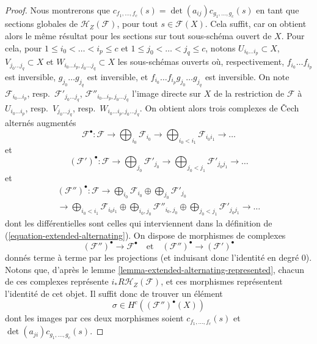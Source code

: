 \begin{proof}
Nous montrerons que $c_{f_1, \ldots, f_c}(s) =
\det(a_{ij}) c_{g_1, \ldots, g_c}(s)$ en tant que sections globales de
$\mathcal{H}_Z(\mathcal{F})$, pour tout $s \in \mathcal{F}(X)$.
Cela suffit, car on obtient alors le même résultat pour les
sections sur tout sous-schéma ouvert de $X$.
Pour cela, pour $1 \leq i_0 < \ldots < i_p \leq c$
et $1 \leq j_0 < \ldots < j_q \leq c$, notons
$U_{i_0 \ldots i_p} \subset X$,
$V_{j_0 \ldots j_q} \subset X$ et
$W_{i_0 \ldots i_p, j_0 \ldots j_q} \subset X$
les sous-schémas ouverts où, respectivement, $f_{i_0} \ldots f_{i_p}$ est inversible,
$g_{j_0} \ldots g_{j_q}$ est inversible, et
$f_{i_0} \ldots f_{i_p}g_{j_0} \ldots g_{j_q}$ est inversible.
On note $\mathcal{F}_{i_0 \ldots i_p}$,
resp.\ $\mathcal{F}'_{j_0 \ldots j_q}$,
$\mathcal{F}''_{i_0 \ldots i_p, j_0 \ldots j_q}$
l'image directe sur $X$ de la restriction de $\mathcal{F}$ à
$U_{i_0 \ldots i_p}$, resp.\ $V_{j_0 \ldots j_q}$,
resp.\ $W_{i_0 \ldots i_p, j_0 \ldots j_q}$.
On obtient alors trois complexes de {\v C}ech alternés augmentés
$$
\mathcal{F}^\bullet :
\mathcal{F} \to \bigoplus\nolimits_{i_0} \mathcal{F}_{i_0} \to
\bigoplus\nolimits_{i_0 < i_1} \mathcal{F}_{i_0i_1} \to \ldots
$$
et
$$
(\mathcal{F}')^\bullet :
\mathcal{F} \to \bigoplus\nolimits_{j_0} \mathcal{F}'_{j_0} \to
\bigoplus\nolimits_{j_0 < j_1} \mathcal{F}'_{j_0j_1} \to \ldots
$$
et
$$
\begin{gathered}
(\mathcal{F}'')^\bullet :
\mathcal{F} \to
\bigoplus\nolimits_{i_0} \mathcal{F}_{i_0} \oplus
\bigoplus\nolimits_{j_0} \mathcal{F}'_{j_0} \\
{}\to
\bigoplus\nolimits_{i_0 < i_1} \mathcal{F}_{i_0i_1} \oplus
\bigoplus\nolimits_{i_0, j_0} \mathcal{F}''_{i_0, j_0} \oplus
\bigoplus\nolimits_{j_0 < j_1} \mathcal{F}'_{j_0j_1} \to
\ldots
\end{gathered}
$$
dont les différentielles sont celles qui interviennent dans la définition de
(\ref{equation-extended-alternating}).
On dispose de morphismes de complexes
$$
(\mathcal{F}'')^\bullet \to \mathcal{F}^\bullet
\quad\text{et}\quad
(\mathcal{F}'')^\bullet \to (\mathcal{F}')^\bullet
$$
donnés terme à terme par les projections (et induisant donc
l'identité en degré $0$). Notons que, d'après
le lemme \ref{lemma-extended-alternating-represented},
chacun de ces complexes représente
$i_*R\mathcal{H}_Z(\mathcal{F})$, et ces morphismes
représentent l'identité de cet objet. Il suffit donc
de trouver un élément
$$
\sigma \in H^c((\mathcal{F}'')^\bullet(X))
$$
dont les images par ces deux morphismes soient $c_{f_1, \ldots, f_c}(s)$ et $\det(a_{ji})c_{g_1, \ldots, g_c}(s)$.

\end{proof}
